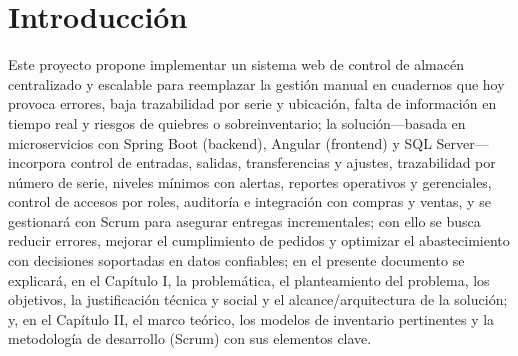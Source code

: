 \documentclass[12pt]{article} %
\begin{document}
\begin{abstract}

La empresa, dedicada a la comercialización de componentes de PC, atraviesa un proceso de expansión que ha incrementado el número de sedes y el volumen de operaciones. Sin embargo, el control de inventario continúa realizándose de forma manual en cuadernos físicos, lo que provoca registros incompletos o duplicados, demoras en la actualización de existencias, ausencia de información en tiempo real y alta exposición a pérdidas por extravío o deterioro del soporte. La falta de trazabilidad por número de serie y por ubicación dificulta la conciliación entre almacenes y puntos de venta, limita la detección de mermas y devoluciones y reduce la confiabilidad de los datos.

Frente a este contexto, se plantea el desarrollo de un sistema web de inventario centralizado, escalable y seguro, que provea visibilidad en tiempo real del stock en múltiples sucursales y garantice datos consistentes. La solución propuesta se fundamenta en una arquitectura de microservicios, con Spring Boot para el backend, Angular para el frontend y SQL Server como motor de base de datos, privilegiando la trazabilidad, la disponibilidad y la facilidad de mantenimiento. El proyecto se gestionará con Scrum, mediante sprints cortos y entregables incrementales (MVP temprano, pruebas unitarias e integración, despliegue progresivo), asegurando alineamiento continuo con las necesidades del negocio y una adopción ordenada por parte de los usuarios.


\end{abstract}
\newpage

\section*{Introducción}

Este proyecto propone implementar un sistema web de control de almacén centralizado y escalable para reemplazar la gestión manual en cuadernos que hoy provoca errores, baja trazabilidad por serie y ubicación, falta de información en tiempo real y riesgos de quiebres o sobreinventario; la solución—basada en microservicios con Spring Boot (backend), Angular (frontend) y SQL Server—incorpora control de entradas, salidas, transferencias y ajustes, trazabilidad por número de serie, niveles mínimos con alertas, reportes operativos y gerenciales, control de accesos por roles, auditoría e integración con compras y ventas, y se gestionará con Scrum para asegurar entregas incrementales; con ello se busca reducir errores, mejorar el cumplimiento de pedidos y optimizar el abastecimiento con decisiones soportadas en datos confiables; en el presente documento se explicará, en el Capítulo I, la problemática, el planteamiento del problema, los objetivos, la justificación técnica y social y el alcance/arquitectura de la solución; y, en el Capítulo II, el marco teórico, los modelos de inventario pertinentes y la metodología de desarrollo (Scrum) con sus elementos clave.
\end{document}
